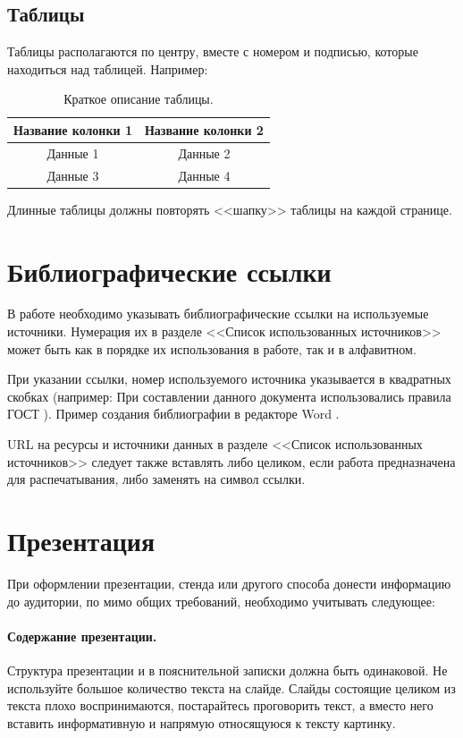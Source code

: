 \subsection{Таблицы}
\par Таблицы располагаются по центру, вместе с номером и подписью, которые находиться над таблицей. Например:~
\begin{table}[H]
    \centering
    \caption{\label{table}Краткое описание таблицы.}
    \begin{tabular}{|c|c|}
        \hline
        \bf{Название колонки 1} & \bf{Название колонки 2}  \\
        \hline
        Данные 1 & Данные 2 \\
        \hline
        Данные 3 & Данные 4 \\
        \hline
       \end{tabular}
\end{table}  
\par Длинные таблицы должны повторять <<шапку>> таблицы на каждой странице.


\section{Библиографические ссылки}
В работе необходимо указывать библиографические ссылки на используемые источники. Нумерация их в разделе <<Список использованных источников>> может быть как в порядке их использования в работе, так и в алфавитном. 
\par При указании ссылки, номер используемого источника указывается в квадратных скобках (например: При составлении данного документа использовались правила ГОСТ \cite{Standart2017}). Пример создания библиографии в редакторе Word \cite{wordexpample}. 
\par URL на ресурсы и источники данных в разделе <<Список использованных источников>> следует также вставлять либо целиком, если работа предназначена для распечатывания, либо заменять на символ ссылки.

\section{Презентация}
При оформлении презентации, стенда или другого способа донести информацию до аудитории, по мимо общих требований, необходимо учитывать следующее:
\paragraph{Содержание презентации.} Структура презентации и в пояснительной записки должна быть одинаковой. Не используйте большое количество текста на слайде. Слайды состоящие целиком из текста плохо воспринимаются, постарайтесь проговорить текст, а вместо него вставить информативную и напрямую относящуюся к тексту картинку. 
